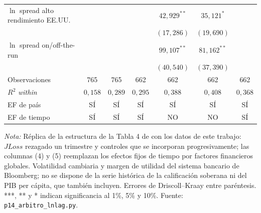 \begin{table}[htbp]
\begin{tabular}{lcccccc}
$\ln$ spread alto rendimiento EE.UU. &  &  &  & $42{,}929^{**}$ & $35{,}121^{*}$ &  \\
 &  &  &  & $(17{,}286)$ & $(19{,}690)$ &  \\
$\ln$ spread on/off-the-run &  &  &  & $99{,}107^{**}$ & $81{,}162^{**}$ &  \\
 &  &  &  & $(40{,}540)$ & $(37{,}390)$ &  \\
\midrule
Observaciones & 765 & 765 & 662 & 662 & 662 & 662 \\
$R^2$ \textit{within} & $0{,}158$ & $0{,}289$ & $0{,}295$ & $0{,}388$ & $0{,}408$ & $0{,}368$ \\
EF de país & SÍ & SÍ & SÍ & SÍ & SÍ & SÍ \\
EF de tiempo & SÍ & SÍ & SÍ & NO & NO & SÍ \\
\bottomrule
\end{tabular}
\par\smallskip\parbox{0.95\linewidth}{\scriptsize \textit{Nota:} Réplica de la estructura de la Tabla 4 de \citet{Chari2024b} con los datos de este trabajo: $JLoss$ rezagado un trimestre y controles que se incorporan progresivamente; las columnas (4) y (5) reemplazan los efectos fijos de tiempo por factores financieros globales. Volatilidad cambiaria y margen de utilidad del sistema bancario de Bloomberg; no se dispone de la serie histórica de la calificación soberana ni del PIB per cápita, que \citet{Chari2024b} también incluyen. Errores de Driscoll--Kraay entre paréntesis. ***, ** y * indican significancia al 1\%, 5\% y 10\%. Fuente: \texttt{p14\_arbitro\_lnlag.py}.}
\end{table}

